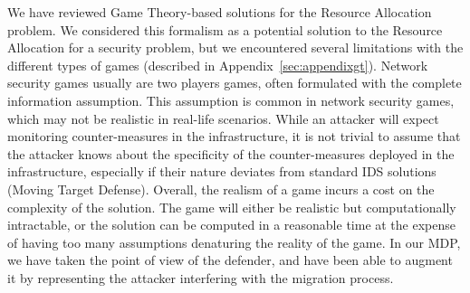 We have reviewed Game Theory-based solutions for the Resource Allocation problem.
We considered this formalism as a potential solution to the Resource Allocation for a security problem, but we encountered several limitations with the different types of games (described in Appendix~\ref{sec:appendixgt}). Network security games  usually are two players games, often formulated with the complete information assumption. This assumption is common in network security games, which may not be realistic in real-life scenarios.
While an attacker will expect monitoring counter-measures in the infrastructure, it is not trivial to assume that the attacker knows about the specificity of the counter-measures deployed in the infrastructure, especially if their nature deviates from standard IDS solutions (\eg Moving Target Defense).
Overall,  the realism of a game incurs a cost on the complexity of the solution.
The game will either be realistic but computationally intractable, or the solution can be computed in a reasonable time at the expense of having too many assumptions denaturing the reality of the game.
In our MDP, we have taken the point of view of the defender, and have been able to augment it by representing the attacker interfering with the migration process. 




